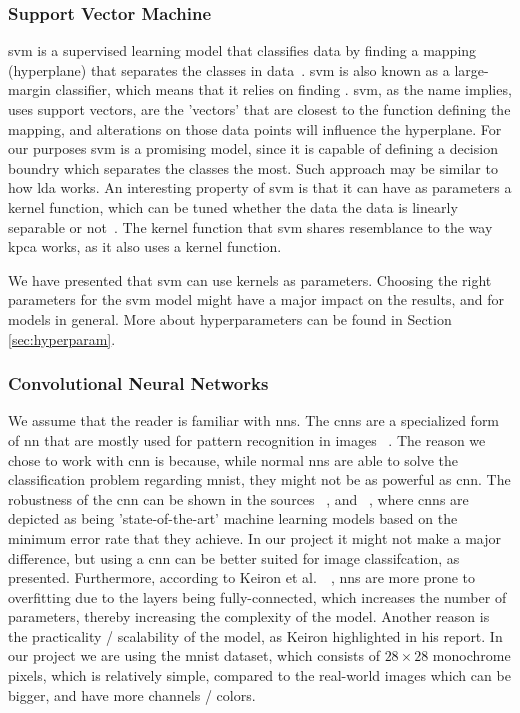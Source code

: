 \subsubsection{Support Vector Machine}\label{subsubsec:support-vector-machine}
\gls{svm} is a supervised learning model that classifies data by finding a mapping (hyperplane) that separates the classes in data~\cite{faster-svm}. \gls{svm} is also known as a large-margin classifier, which means that it relies on finding . \gls{svm}, as the name implies, uses support vectors, are the 'vectors' that are closest to the function defining the mapping, and alterations on those data points will influence the hyperplane. For our purposes \gls{svm} is a promising model, since it is capable of defining a decision boundry which separates the classes the most. Such approach may be similar to how \gls{lda} works. An interesting property of \gls{svm} is that it can have as parameters a kernel function, which can be tuned whether the data the data is linearly separable or not~\cite{faster-svm}. The kernel function that \gls{svm} shares resemblance to the way \gls{kpca} works, as it also uses a kernel function.


We have presented that \gls{svm} can use kernels as parameters. Choosing the right parameters for the \gls{svm} model might have a major impact on the results, and for models in general. More about hyperparameters can be found in Section \ref{sec:hyperparam}.


\subsubsection{Convolutional Neural Networks}\label{subsubsec:convolutional-neural-networks}
We assume that the reader is familiar with \gls{nn}s. The \gls{cnn}s are a specialized form of \gls{nn} that are mostly used for pattern recognition in images ~\cite{introduction-to-cnn}. The reason we chose to work with \gls{cnn} is because, while normal \gls{nn}s are able to solve the classification problem regarding \gls{mnist}, they might not be as powerful as \gls{cnn}. The robustness of the \gls{cnn} can be shown in the sources ~\cite{lecun-mnist-database}, and  ~\cite{mnist-classification-benchmark}, where \gls{cnn}s are depicted as being 'state-of-the-art' machine learning models based on the minimum error rate that they achieve. In our project it might not make a major difference, but using a \gls{cnn} can be better suited for image classifcation, as presented. Furthermore, according to Keiron et al.\ ~\cite{introduction-to-cnn}, \gls{nn}s are more prone to overfitting due to the layers being fully-connected, which increases the number of parameters, thereby increasing the complexity of the model. Another reason is the practicality / scalability of the model, as Keiron highlighted in his report. In our project we are using the \gls{mnist} dataset, which consists of $28 \times 28$ monochrome pixels, which is relatively simple, compared to the real-world images which can be bigger, and have more channels / colors.

